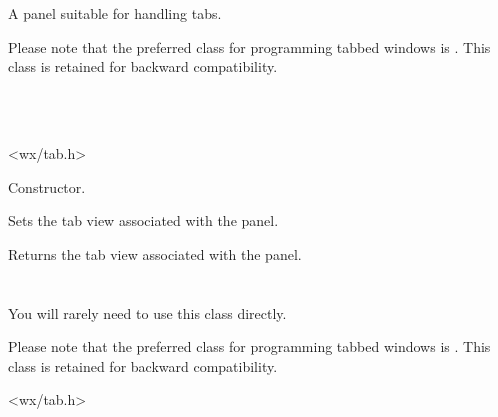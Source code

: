 A panel suitable for handling tabs.

Please note that the preferred class for programming tabbed windows is .
This class is retained for backward compatibility.


\\
\\


<wx/tab.h>






Constructor.



Sets the tab view associated with the panel.



Returns the tab view associated with the panel.

\section{}\label{wxtabcontrol}

You will rarely need to use this class directly.

Please note that the preferred class for programming tabbed windows is .
This class is retained for backward compatibility.




<wx/tab.h>


